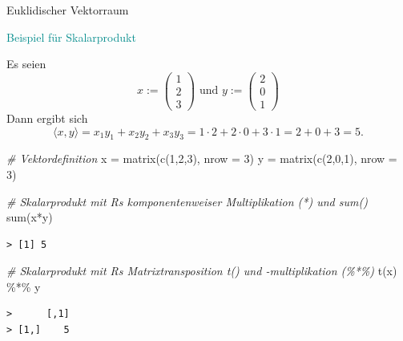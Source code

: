 \documentclass[
  8pt,
  ignorenonframetext,
]{beamer}
\newenvironment{Shaded}{\begin{snugshade}}{\end{snugshade}}
\newcommand{\AttributeTok}[1]{\textcolor[rgb]{0.77,0.63,0.00}{#1}}
\newcommand{\CommentTok}[1]{\textcolor[rgb]{0.56,0.35,0.01}{\textit{#1}}}
\newcommand{\DecValTok}[1]{\textcolor[rgb]{0.00,0.00,0.81}{#1}}
\newcommand{\FunctionTok}[1]{\textcolor[rgb]{0.00,0.00,0.00}{#1}}
\newcommand{\NormalTok}[1]{#1}
\newcommand{\OtherTok}[1]{\textcolor[rgb]{0.56,0.35,0.01}{#1}}
\newcommand{\SpecialCharTok}[1]{\textcolor[rgb]{0.00,0.00,0.00}{#1}}
\begin{document}
\begin{frame}[fragile]{Euklidischer Vektorraum}
\protect\hypertarget{euklidischer-vektorraum-1}{}
\vspace{3mm}

\textcolor{darkcyan}{Beispiel für Skalarprodukt}

\footnotesize

Es seien \begin{equation}
x:= \begin{pmatrix}1\\2\\3\end{pmatrix} \text{ und } y:= \begin{pmatrix}2\\0\\1\end{pmatrix}
\end{equation} Dann ergibt sich \begin{equation}
\langle x,y\rangle = x_1 y_1 + x_2 y_2 +  x_3  y_3 = 1 \cdot 2 + 2 \cdot 0 +  3 \cdot 1 = 2+0+3 = 5.
\end{equation}

\vspace{6pt}

\begin{Shaded}
\begin{Highlighting}[]
\CommentTok{\# Vektordefinition}
\NormalTok{x }\OtherTok{=} \FunctionTok{matrix}\NormalTok{(}\FunctionTok{c}\NormalTok{(}\DecValTok{1}\NormalTok{,}\DecValTok{2}\NormalTok{,}\DecValTok{3}\NormalTok{), }\AttributeTok{nrow =} \DecValTok{3}\NormalTok{)}
\NormalTok{y }\OtherTok{=} \FunctionTok{matrix}\NormalTok{(}\FunctionTok{c}\NormalTok{(}\DecValTok{2}\NormalTok{,}\DecValTok{0}\NormalTok{,}\DecValTok{1}\NormalTok{), }\AttributeTok{nrow =} \DecValTok{3}\NormalTok{)}
\end{Highlighting}
\end{Shaded}

\begin{Shaded}
\begin{Highlighting}[]
\CommentTok{\# Skalarprodukt mit R\textquotesingle{}s komponentenweiser Multiplikation (*) und sum()}
\FunctionTok{sum}\NormalTok{(x}\SpecialCharTok{*}\NormalTok{y)}
\end{Highlighting}
\end{Shaded}

\begin{verbatim}
> [1] 5
\end{verbatim}

\begin{Shaded}
\begin{Highlighting}[]
\CommentTok{\# Skalarprodukt mit R\textquotesingle{}s Matrixtransposition t() und {-}multiplikation (\%*\%)}
\FunctionTok{t}\NormalTok{(x) }\SpecialCharTok{\%*\%}\NormalTok{ y}
\end{Highlighting}
\end{Shaded}

\begin{verbatim}
>      [,1]
> [1,]    5
\end{verbatim}
\end{frame}
\end{document}

